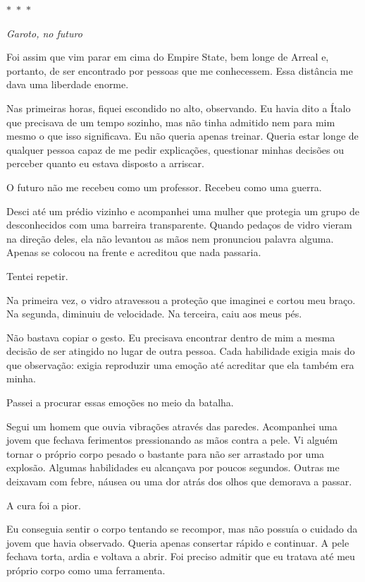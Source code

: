 \begin{center}
$\ast$~$\ast$~$\ast$

\textit{Garoto, no futuro}
\end{center}

Foi assim que vim parar em cima do Empire State, bem longe de Arreal e, portanto, de ser encontrado por pessoas que me conhecessem.
Essa distância me dava uma liberdade enorme.

Nas primeiras horas, fiquei escondido no alto, observando. Eu havia dito a Ítalo que precisava de um tempo sozinho, mas não tinha admitido nem para mim mesmo o que isso significava. Eu não queria apenas treinar. Queria estar longe de qualquer pessoa capaz de me pedir explicações, questionar minhas decisões ou perceber quanto eu estava disposto a arriscar.

O futuro não me recebeu como um professor. Recebeu como uma guerra.

Desci até um prédio vizinho e acompanhei uma mulher que protegia um grupo de desconhecidos com uma barreira transparente. Quando pedaços de vidro vieram na direção deles, ela não levantou as mãos nem pronunciou palavra alguma. Apenas se colocou na frente e acreditou que nada passaria.

Tentei repetir.

Na primeira vez, o vidro atravessou a proteção que imaginei e cortou meu braço. Na segunda, diminuiu de velocidade. Na terceira, caiu aos meus pés.

Não bastava copiar o gesto. Eu precisava encontrar dentro de mim a mesma decisão de ser atingido no lugar de outra pessoa. Cada habilidade exigia mais do que observação: exigia reproduzir uma emoção até acreditar que ela também era minha.

Passei a procurar essas emoções no meio da batalha.

Segui um homem que ouvia vibrações através das paredes. Acompanhei uma jovem que fechava ferimentos pressionando as mãos contra a pele. Vi alguém tornar o próprio corpo pesado o bastante para não ser arrastado por uma explosão. Algumas habilidades eu alcançava por poucos segundos. Outras me deixavam com febre, náusea ou uma dor atrás dos olhos que demorava a passar.

A cura foi a pior.

Eu conseguia sentir o corpo tentando se recompor, mas não possuía o cuidado da jovem que havia observado. Queria apenas consertar rápido e continuar. A pele fechava torta, ardia e voltava a abrir. Foi preciso admitir que eu tratava até meu próprio corpo como uma ferramenta.

